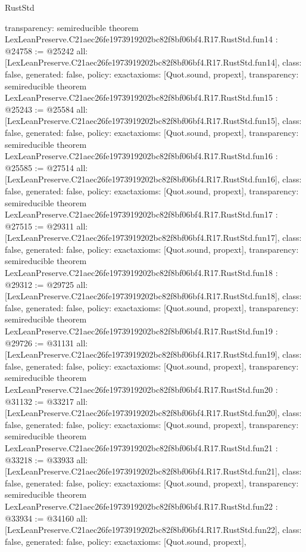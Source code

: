 \begin{lexlean}{RustStd}
\begin{coremodule}
{  transparency: semireducible
}
theorem LexLeanPreserve.C21aec26fe1973919202bc82f8bf06bf4.R17.RustStd.fun14 : @24758 := @25242 {
  all: [LexLeanPreserve.C21aec26fe1973919202bc82f8bf06bf4.R17.RustStd.fun14],
  class: false,
  generated: false,
  policy: exact{axioms: [Quot.sound, propext]},
  transparency: semireducible
}
theorem LexLeanPreserve.C21aec26fe1973919202bc82f8bf06bf4.R17.RustStd.fun15 : @25243 := @25584 {
  all: [LexLeanPreserve.C21aec26fe1973919202bc82f8bf06bf4.R17.RustStd.fun15],
  class: false,
  generated: false,
  policy: exact{axioms: [Quot.sound, propext]},
  transparency: semireducible
}
theorem LexLeanPreserve.C21aec26fe1973919202bc82f8bf06bf4.R17.RustStd.fun16 : @25585 := @27514 {
  all: [LexLeanPreserve.C21aec26fe1973919202bc82f8bf06bf4.R17.RustStd.fun16],
  class: false,
  generated: false,
  policy: exact{axioms: [Quot.sound, propext]},
  transparency: semireducible
}
theorem LexLeanPreserve.C21aec26fe1973919202bc82f8bf06bf4.R17.RustStd.fun17 : @27515 := @29311 {
  all: [LexLeanPreserve.C21aec26fe1973919202bc82f8bf06bf4.R17.RustStd.fun17],
  class: false,
  generated: false,
  policy: exact{axioms: [Quot.sound, propext]},
  transparency: semireducible
}
theorem LexLeanPreserve.C21aec26fe1973919202bc82f8bf06bf4.R17.RustStd.fun18 : @29312 := @29725 {
  all: [LexLeanPreserve.C21aec26fe1973919202bc82f8bf06bf4.R17.RustStd.fun18],
  class: false,
  generated: false,
  policy: exact{axioms: [Quot.sound, propext]},
  transparency: semireducible
}
theorem LexLeanPreserve.C21aec26fe1973919202bc82f8bf06bf4.R17.RustStd.fun19 : @29726 := @31131 {
  all: [LexLeanPreserve.C21aec26fe1973919202bc82f8bf06bf4.R17.RustStd.fun19],
  class: false,
  generated: false,
  policy: exact{axioms: [Quot.sound, propext]},
  transparency: semireducible
}
theorem LexLeanPreserve.C21aec26fe1973919202bc82f8bf06bf4.R17.RustStd.fun20 : @31132 := @33217 {
  all: [LexLeanPreserve.C21aec26fe1973919202bc82f8bf06bf4.R17.RustStd.fun20],
  class: false,
  generated: false,
  policy: exact{axioms: [Quot.sound, propext]},
  transparency: semireducible
}
theorem LexLeanPreserve.C21aec26fe1973919202bc82f8bf06bf4.R17.RustStd.fun21 : @33218 := @33933 {
  all: [LexLeanPreserve.C21aec26fe1973919202bc82f8bf06bf4.R17.RustStd.fun21],
  class: false,
  generated: false,
  policy: exact{axioms: [Quot.sound, propext]},
  transparency: semireducible
}
theorem LexLeanPreserve.C21aec26fe1973919202bc82f8bf06bf4.R17.RustStd.fun22 : @33934 := @34160 {
  all: [LexLeanPreserve.C21aec26fe1973919202bc82f8bf06bf4.R17.RustStd.fun22],
  class: false,
  generated: false,
  policy: exact{axioms: [Quot.sound, propext]},
}
\end{coremodule}
\end{lexlean}

